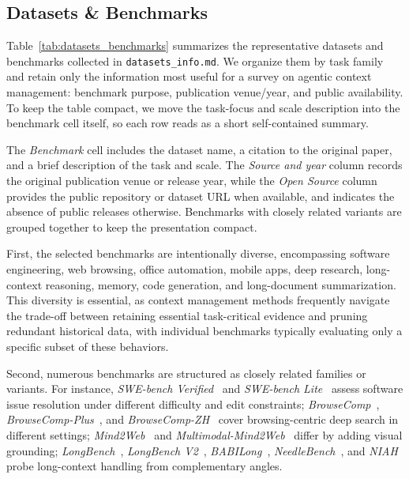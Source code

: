 \subsection{Datasets \& Benchmarks}
Table~\ref{tab:datasets_benchmarks} summarizes the representative datasets and benchmarks collected in \texttt{datasets\_info.md}. We organize them by task family and retain only the information most useful for a survey on agentic context management: benchmark purpose, publication venue/year, and public availability. To keep the table compact, we move the task-focus and scale description into the benchmark cell itself, so each row reads as a short self-contained summary.

The \emph{Benchmark} cell includes the dataset name, a citation to the original paper, and a brief description of the task and scale. The \emph{Source and year} column records the original publication venue or release year, while the \emph{Open Source} column provides the public repository or dataset URL when available, and indicates the absence of public releases otherwise. Benchmarks with closely related variants are grouped together to keep the presentation compact.

First, the selected benchmarks are intentionally diverse, encompassing software engineering, web browsing, office automation, mobile apps, deep research, long-context reasoning, memory, code generation, and long-document summarization. This diversity is essential, as context management methods frequently navigate the trade-off between retaining essential task-critical evidence and pruning redundant historical data, with individual benchmarks typically evaluating only a specific subset of these behaviors.

Second, numerous benchmarks are structured as closely related families or variants. For instance, \emph{SWE-bench Verified}~\citep{jimenez2024swebench} and \emph{SWE-bench Lite}~\citep{jimenez2024swebench} assess software issue resolution under different difficulty and edit constraints; \emph{BrowseComp}~\citep{wei2025browsecomp}, \emph{BrowseComp-Plus}~\citep{chen2025browsecompplus}, and \emph{BrowseComp-ZH}~\citep{zhou2025browsecompzh} cover browsing-centric deep search in different settings; \emph{Mind2Web}~\citep{deng2023mind2web} and \emph{Multimodal-Mind2Web}~\citep{zheng2024seeact} differ by adding visual grounding; \emph{LongBench}~\citep{bai2024longbench}, \emph{LongBench V2}~\citep{bai2025longbenchv2}, \emph{BABILong}~\citep{NEURIPS2024_babilong}, \emph{NeedleBench}~\citep{li2024needlebench}, and \emph{NIAH}~\citep{liu2023lost} probe long-context handling from complementary angles.

